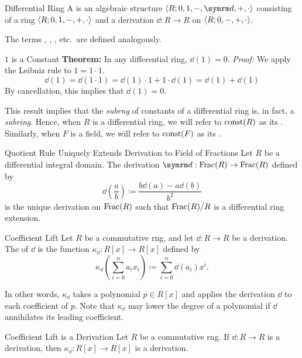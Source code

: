 \begin{dfnbox}{Differential Ring}
	A  is an algebraic structure $\alg{R; 0, 1, -, \dd, +, \cdot}$ consisting of a ring ${\langle {R; 0, 1, -, +, \cdot} \rangle}$ and a derivation $\dd: R \to R$ on ${\langle {R; 0, -, +, \cdot} \rangle}$.
\end{dfnbox}

The terms , , , etc.\ are defined analogously.

\begin{thmbox}{$1$ is a Constant}
	\textbf{Theorem:} In any differential ring, $\dd(1) = 0$.
\tcblower
	\textit{Proof:} We apply the Leibniz rule to $1 = 1 \cdot 1$.
	\[ \dd(1) = \dd(1 \cdot 1) = \dd(1) \cdot 1 + 1 \cdot \dd(1) = \dd(1) + \dd(1) \]
	By cancellation, this implies that $\dd(1) = 0$.
\end{thmbox}

This result implies that the \textit{subrng} of constants of a differential ring is, in fact, a \textit{subring}. Hence, when $R$ is a differential ring, we will refer to $\operatorname{const}(R)$ as its . Similarly, when $F$ is a field, we will refer to $\operatorname{const}(F)$ as its .

\begin{thmbox}{Quotient Rule Uniquely Extends Derivation to Field of Fractions}
	Let $R$ be a differential integral domain. The derivation $\dd: \Frac(R) \to \Frac(R)$ defined by
	\[ \dd\left( \frac{a}{b} \right) \coloneq \frac{b \dd(a) - a \dd(b)}{b^2} \]
	is the unique derivation on $\operatorname{Frac}(R)$ such that $\operatorname{Frac}(R)/R$ is a differential ring extension.
\end{thmbox}

\begin{dfnbox}{Coefficient Lift}
	Let $R$ be a commutative rng, and let $\dd: R \to R$ be a derivation. The  of $\dd$ is the function $\kappa_\dd: R[x] \to R[x]$ defined by
	\[ \kappa_\dd\left( \sum_{i=0}^n a_i x_i \right) \coloneq \sum_{i=0}^n \dd(a_i) x^i. \]
\end{dfnbox}

In other words, $\kappa_\dd$ takes a polynomial $p \in R[x]$ and applies the derivation $\dd$ to each coefficient of $p$. Note that $\kappa_\dd$ may lower the degree of a polynomial if $\dd$ annihilates its leading coefficient.

\begin{thmbox}{Coefficient Lift is a Derivation}
	Let $R$ be a commutative rng. If $\dd: R \to R$ is a derivation, then $\kappa_\dd: R[x] \to R[x]$ is a derivation.
\end{thmbox}

